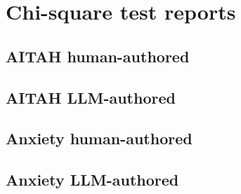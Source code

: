 \chapter{Chi-square test reports}\label{appendixB}

\minitoc

\section{AITAH human-authored}\label{sec:aitah-human}


\section{AITAH LLM-authored}\label{sec:aitah-llm}


\section{Anxiety human-authored}\label{sec:anxiety-human}


\section{Anxiety LLM-authored}\label{sec:anxiety-llm}
